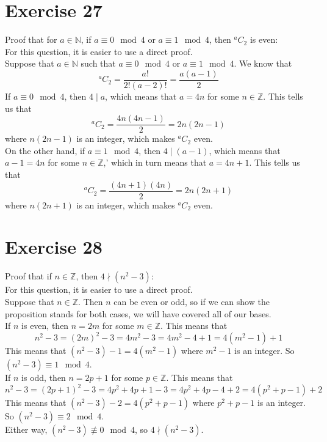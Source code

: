 \documentclass[12pt]{article}
\newcommand{\N}{\mathbb{N}}
\newcommand{\Z}{\mathbb{Z}}
\newcommand*{\comb}[2]{{}^{#1}C_{#2}}
\begin{document}
    \section*{Exercise 27}
    Proof that for $a \in \N$,
    if $a \equiv 0 \mod 4$ or $a \equiv 1 \mod 4$,
    then $\comb{a}{2}$ is even: \\
    For this question, it is easier to use a direct proof. \\
    Suppose that $a \in \N$
    such that $a \equiv 0 \mod 4$ or $a \equiv 1 \mod 4$.
    We know that
    \[ \comb{a}{2} = \dfrac{a!}{2!(a-2)!} = \dfrac{a(a-1)}{2} \]
    If $a \equiv 0 \mod 4$,
    then $4 \mid a$,
    which means that $a = 4n$ for some $n \in \Z$.
    This tells us that 
    \[ \comb{a}{2} = \dfrac{4n(4n-1)}{2} = 2n(2n-1) \]
    where $n(2n-1)$ is an integer,
    which makes $\comb{a}{2}$ even. \\
    On the other hand, if $a \equiv 1 \mod 4$,
    then $4 \mid (a-1)$,
    which means that $a-1 = 4n$ for some $n \in \Z$,'
    which in turn means that $a = 4n + 1$.
    This tells us that 
    \[ \comb{a}{2} = \dfrac{(4n+1)(4n)}{2} = 2n(2n+1) \]
    where $n(2n+1)$ is an integer,
    which makes $\comb{a}{2}$ even. \\

    \section*{Exercise 28}
    Proof that if $n \in \Z$,
    then $4 \nmid (n^2 - 3)$: \\
    For this question, it is easier to use a direct proof. \\
    Suppose that $n \in \Z$.
    Then $n$ can be even or odd,
    so if we can show the proposition stands for both cases,
    we will have covered all of our bases. \\
    If $n$ is even,
    then $n = 2m$ for some $m \in \Z$.
    This means that
    \[ n^2 - 3 = (2m)^2 - 3 = 4m^2 - 3 = 4m^2 - 4 + 1 = 4(m^2 - 1) + 1 \]
    This means that $(n^2 - 3) - 1 = 4(m^2 - 1)$
    where $m^2 - 1$ is an integer.
    So $(n^2 - 3) \equiv 1 \mod 4$. \\
    If $n$ is odd,
    then $n = 2p+1$ for some $p \in \Z$.
    This means that
    \[ n^2 - 3 = (2p+1)^2 - 3 = 4p^2 + 4p + 1 - 3 =
    4p^2 + 4p - 4 + 2 = 4(p^2 + p - 1) + 2 \]
    This means that $(n^2 - 3) - 2 = 4(p^2 + p - 1)$
    where $p^2 + p - 1$ is an integer.
    So $(n^2 - 3) \equiv 2 \mod 4$. \\
    Either way,
    $(n^2 - 3) \not\equiv 0 \mod 4$,
    so $4 \nmid (n^2 - 3)$. \\
\end{document}
